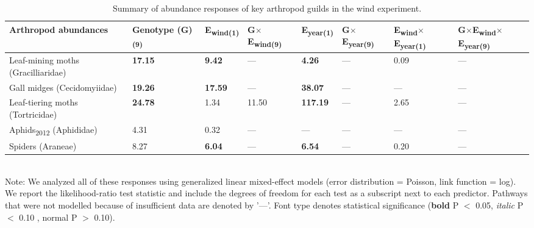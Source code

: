\documentclass[11pt]{article}
\begin{document}
\begin{table}
\centering
\caption{Summary of abundance responses of key arthropod
guilds in the wind experiment.}
\label{wGuild}
\begin{tabular}{@{}llllllll@{}}
\toprule
Arthropod abundances & Genotype (G)\textsubscript{(9)} &
E\textsubscript{wind(1)} & G$\times$E\textsubscript{wind(9)} & E\textsubscript{year(1)} & G$\times$E\textsubscript{year(9)} & E\textsubscript{wind}$\times$E\textsubscript{year(1)} & G$\times$E\textsubscript{wind}$\times$E\textsubscript{year(9)}\tabularnewline
\midrule
Leaf-mining moths (Gracilliaridae) & \textbf{17.15} & \textbf{9.42} & ---
& \textbf{4.26} & --- & 0.09 & ---\tabularnewline
Gall midges (Cecidomyiidae) & \textbf{19.26} & \textbf{17.59} & --- &
\textbf{38.07} & --- & --- & ---\tabularnewline
Leaf-tiering moths (Tortricidae) & \textbf{24.78} & 1.34 & 11.50 &
\textbf{117.19} & --- & 2.65 & ---\tabularnewline
Aphids\textsubscript{2012} (Aphididae) & 4.31 & 0.32 & --- & --- & --- & --- & ---\tabularnewline
Spiders (Araneae) & 8.27 & \textbf{6.04} & --- & \textbf{6.54} & --- & 0.20 & ---\tabularnewline
\bottomrule
\end{tabular}
\bigskip{} 
\\
{\footnotesize Note: We analyzed all of these responses
using generalized linear mixed-effect models (error distribution = Poisson, link function = log). We report the likelihood-ratio test statistic and include the degrees of freedom for each test as a subscript next to each predictor. Pathways that were not modelled because of insufficient data are denoted by '---'. Font type denotes statistical significance (\textbf{bold} P $<$ 0.05, \textit{italic} P $<$ 0.10 , normal P $>$ 0.10).}
\end{table}
\end{document}
